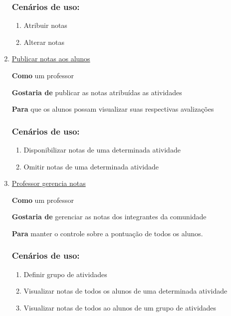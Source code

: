 \begin{enumerate}
\subsubsection*{Cenários de uso:}
\begin{enumerate}
\item Atribuir notas
\item Alterar notas
\end{enumerate}


\item \underline{Publicar notas aos alunos}

\textbf{Como} um professor

\textbf{Gostaria de} publicar as notas atribuídas as atividades

\textbf{Para} que os alunos possam visualizar suas respectivas avalizações

\subsubsection*{Cenários de uso:}
\begin{enumerate}
\item Disponibilizar notas de uma determinada atividade
\item Omitir notas de uma determinada atividade
\end{enumerate}


\item \underline{Professor gerencia notas}

\textbf{Como} um professor

\textbf{Gostaria de} gerenciar as notas dos integrantes da comunidade

\textbf{Para} manter o controle sobre a pontuação de todos os alunos.

\subsubsection*{Cenários de uso:}
\begin{enumerate}
\item Definir grupo de atividades
\item Visualizar notas de todos os alunos de uma determinada atividade
\item Visualizar notas de todos ao alunos de um grupo de atividades
\end{enumerate}


\end{enumerate}
